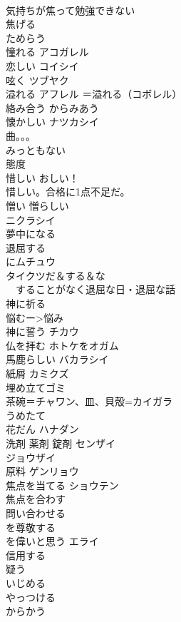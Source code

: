 \documentclass[8pt]{extreport}
\begin{document}
\begin{CJK}{UTF8}{min}
\\	気持ちが焦って勉強できない 
\\	焦げる
\\	ためらう	
\\	憧れる	アコガレル 
\\	恋しい	コイシイ 
\\	呟く	ツブヤク 
\\	溢れる	アフレル ＝溢れる（コボレル） 
\\	絡み合う	からみあう 
\\	懐かしい	ナツカシイ 
\\	曲。。。
\\	みっともない	
\\	態度
\\	惜しい	おしい！ 
\\	惜しい。合格に1点不足だ。
\\	憎い 憎らしい	
\\	ニクラシイ
\\	夢中になる　
\\	退屈する	
\\	にムチュウ　
\\	タイクツだ＆する＆な
\\	~~することがなく退屈な日・退屈な話
\\	神に祈る	
\\	悩むー>悩み	
\\	神に誓う	チカウ 
\\	仏を拝む	ホトケをオガム 
\\	馬鹿らしい	バカラシイ 
\\	紙屑	カミクズ 
\\	埋め立てゴミ	
\\	茶碗＝チャワン、皿、貝殻=カイガラ
\\	うめたて
\\	花だん	ハナダン 
\\	洗剤 薬剤 錠剤	センザイ 
\\	ジョウザイ
\\	原料	ゲンリョウ 
\\	焦点を当てる	ショウテン 
\\	焦点を合わす 
\\	問い合わせる	
\\	を尊敬する	
\\	を偉いと思う	エライ 
\\	信用する 
\\	疑う	
\\	いじめる	
\\	やっつける	
\\	からかう	

\end{CJK}
\end{document}
